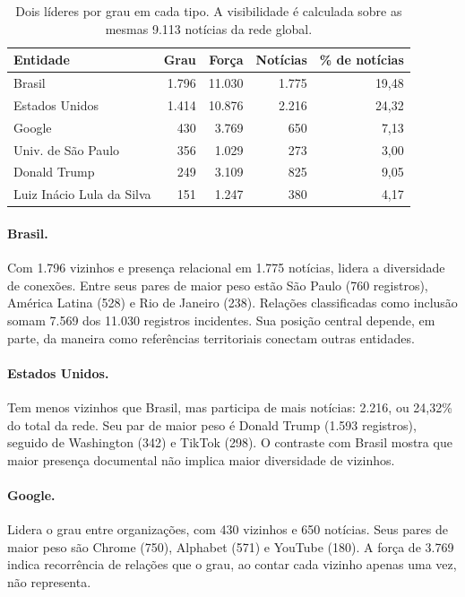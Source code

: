 \documentclass[11pt,a4paper]{article}
\begin{document}
\begin{table}[H]\centering\small
\caption{Dois líderes por grau em cada tipo. A visibilidade é calculada sobre as mesmas 9.113 notícias da rede global.}\label{tab:casos}
\begin{tabularx}{\linewidth}{Xrrrr}\toprule
Entidade & Grau & Força & Notícias & \% de notícias\\\midrule
Brasil & 1.796 & 11.030 & 1.775 & 19,48\\
Estados Unidos & 1.414 & 10.876 & 2.216 & 24,32\\
Google & 430 & 3.769 & 650 & 7,13\\
Univ. de São Paulo & 356 & 1.029 & 273 & 3,00\\
Donald Trump & 249 & 3.109 & 825 & 9,05\\
Luiz Inácio Lula da Silva & 151 & 1.247 & 380 & 4,17\\
\bottomrule\end{tabularx}\end{table}

\paragraph{Brasil.} Com 1.796 vizinhos e presença relacional em 1.775 notícias, lidera a diversidade de conexões. Entre seus pares de maior peso estão São Paulo (760 registros), América Latina (528) e Rio de Janeiro (238). Relações classificadas como inclusão somam 7.569 dos 11.030 registros incidentes. Sua posição central depende, em parte, da maneira como referências territoriais conectam outras entidades.

\paragraph{Estados Unidos.} Tem menos vizinhos que Brasil, mas participa de mais notícias: 2.216, ou 24,32\% do total da rede. Seu par de maior peso é Donald Trump (1.593 registros), seguido de Washington (342) e TikTok (298). O contraste com Brasil mostra que maior presença documental não implica maior diversidade de vizinhos.

\paragraph{Google.} Lidera o grau entre organizações, com 430 vizinhos e 650 notícias. Seus pares de maior peso são Chrome (750), Alphabet (571) e YouTube (180). A força de 3.769 indica recorrência de relações que o grau, ao contar cada vizinho apenas uma vez, não representa.
\end{document}
